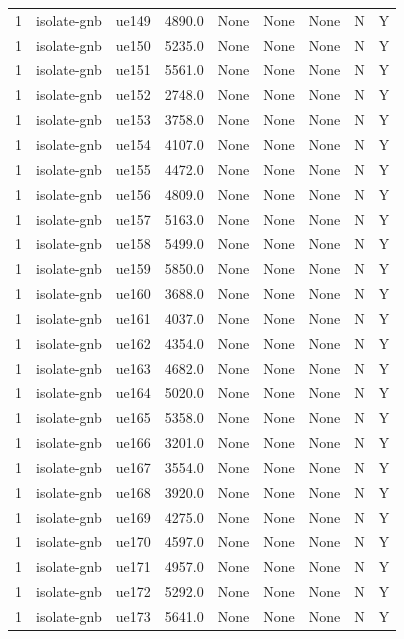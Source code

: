 \begin{table}[ht]
\begin{tabular}{|c|c|c|c|c|c|c|c|c|}
1 & isolate-gnb & ue149 & 4890.0 & None & None & None & N & Y \\
1 & isolate-gnb & ue150 & 5235.0 & None & None & None & N & Y \\
1 & isolate-gnb & ue151 & 5561.0 & None & None & None & N & Y \\
1 & isolate-gnb & ue152 & 2748.0 & None & None & None & N & Y \\
1 & isolate-gnb & ue153 & 3758.0 & None & None & None & N & Y \\
1 & isolate-gnb & ue154 & 4107.0 & None & None & None & N & Y \\
1 & isolate-gnb & ue155 & 4472.0 & None & None & None & N & Y \\
1 & isolate-gnb & ue156 & 4809.0 & None & None & None & N & Y \\
1 & isolate-gnb & ue157 & 5163.0 & None & None & None & N & Y \\
1 & isolate-gnb & ue158 & 5499.0 & None & None & None & N & Y \\
1 & isolate-gnb & ue159 & 5850.0 & None & None & None & N & Y \\
1 & isolate-gnb & ue160 & 3688.0 & None & None & None & N & Y \\
1 & isolate-gnb & ue161 & 4037.0 & None & None & None & N & Y \\
1 & isolate-gnb & ue162 & 4354.0 & None & None & None & N & Y \\
1 & isolate-gnb & ue163 & 4682.0 & None & None & None & N & Y \\
1 & isolate-gnb & ue164 & 5020.0 & None & None & None & N & Y \\
1 & isolate-gnb & ue165 & 5358.0 & None & None & None & N & Y \\
1 & isolate-gnb & ue166 & 3201.0 & None & None & None & N & Y \\
1 & isolate-gnb & ue167 & 3554.0 & None & None & None & N & Y \\
1 & isolate-gnb & ue168 & 3920.0 & None & None & None & N & Y \\
1 & isolate-gnb & ue169 & 4275.0 & None & None & None & N & Y \\
1 & isolate-gnb & ue170 & 4597.0 & None & None & None & N & Y \\
1 & isolate-gnb & ue171 & 4957.0 & None & None & None & N & Y \\
1 & isolate-gnb & ue172 & 5292.0 & None & None & None & N & Y \\
1 & isolate-gnb & ue173 & 5641.0 & None & None & None & N & Y \\

\end{tabular}
\end{table}

